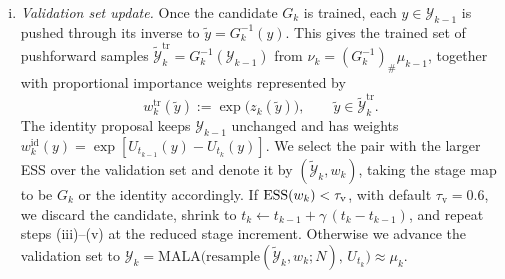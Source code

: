 \documentclass{article}
\begin{document}
\begin{enumerate}[(i)]
\item \emph{Validation set update.} Once the candidate $G_k$ is trained, each $y \in \mathcal Y_{k-1}$ is pushed through its inverse to $\tilde y = G_k^{-1}(y)$. This gives the trained set of pushforward samples $\tilde{\mathcal Y}_k^{\mathrm{tr}} = G_k^{-1}(\mathcal Y_{k-1})$ from $\nu_k = (G_k^{-1})_{\#}\mu_{k-1}$, together with proportional importance weights represented by
\begin{equation*}
    w_k^{\mathrm{tr}}(\tilde y) := \exp\bigl(z_k(\tilde y)\bigr),
    \qquad \tilde y \in \tilde{\mathcal Y}_k^{\mathrm{tr}} .
\end{equation*}
The identity proposal keeps $\mathcal Y_{k-1}$ unchanged and has weights $w_k^{\mathrm{id}}(y)=\exp[U_{t_{k-1}}(y)-U_{t_k}(y)]$. We select the pair with the larger ESS over the validation set and denote it by $(\tilde{\mathcal Y}_k,w_k)$, taking the stage map to be $G_k$ or the identity accordingly. If $\mathrm{ESS}(w_k) < \tau_{\mathrm v}$, with default $\tau_{\mathrm v} = 0.6$, we discard the candidate, shrink to $t_k \gets t_{k-1} + \gamma\,(t_k - t_{k-1})$, and repeat steps (iii)--(v) at the reduced stage increment. Otherwise we advance the validation set to $\mathcal Y_k = \mathrm{MALA}\bigl(\mathrm{resample}(\tilde{\mathcal Y}_k, w_k;N),\, U_{t_k}\bigr) \approx \mu_k$.
\end{enumerate}
\end{document}
